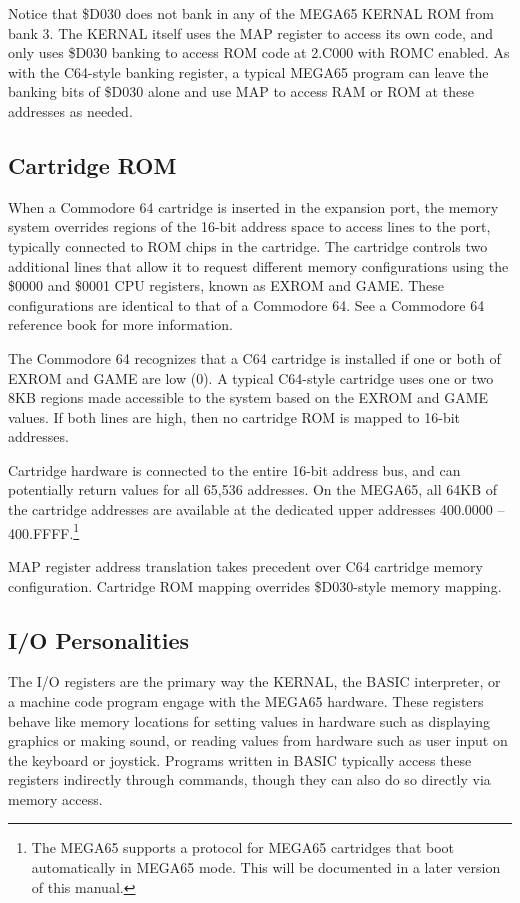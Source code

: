 Notice that \$D030 does not bank in any of the MEGA65 KERNAL ROM from bank 3. The KERNAL itself uses the MAP register to access its own code, and only uses \$D030 banking to access ROM code at 2.C000 with ROMC enabled. As with the C64-style banking register, a typical MEGA65 program can leave the banking bits of \$D030 alone and use MAP to access RAM or ROM at these addresses as needed.

\subsection{Cartridge ROM}

When a Commodore 64 cartridge is inserted in the expansion port, the memory system overrides regions of the 16-bit address space to access lines to the port, typically connected to ROM chips in the cartridge. The cartridge controls two additional lines that allow it to request different memory configurations using the \$0000 and \$0001 CPU registers, known as EXROM and GAME. These configurations are identical to that of a Commodore 64. See a Commodore 64 reference book for more information.

The Commodore 64 recognizes that a C64 cartridge is installed if one or both of EXROM and GAME are low (0). A typical C64-style cartridge uses one or two 8KB regions made accessible to the system based on the EXROM and GAME values. If both lines are high, then no cartridge ROM is mapped to 16-bit addresses.

Cartridge hardware is connected to the entire 16-bit address bus, and can potentially return values for all 65,536 addresses. On the MEGA65, all 64KB of the cartridge addresses are available at the dedicated upper addresses 400.0000 -- 400.FFFF.\footnote{The MEGA65 supports a protocol for MEGA65 cartridges that boot automatically in MEGA65 mode. This will be documented in a later version of this manual.}

MAP register address translation takes precedent over C64 cartridge memory configuration. Cartridge ROM mapping overrides \$D030-style memory mapping.

\subsection{I/O Personalities}

The I/O registers are the primary way the KERNAL, the BASIC interpreter, or a machine code program engage with the MEGA65 hardware. These registers behave like memory locations for setting values in hardware such as displaying graphics or making sound, or reading values from hardware such as user input on the keyboard or joystick. Programs written in BASIC typically access these registers indirectly through commands, though they can also do so directly via memory access.

